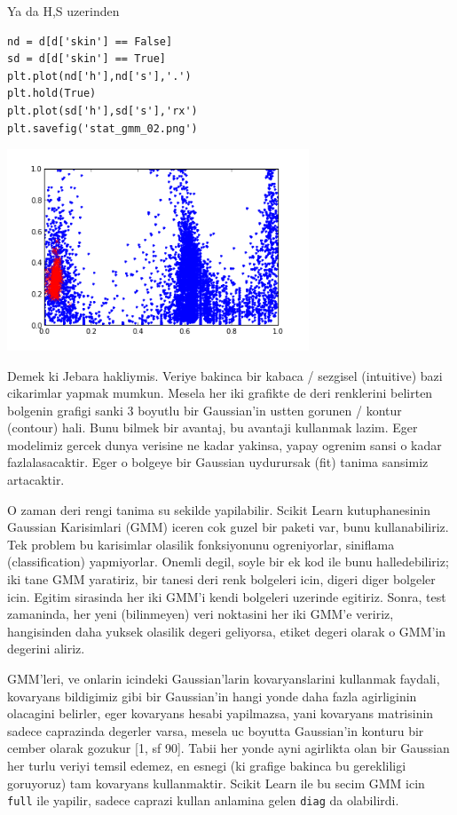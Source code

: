 \documentclass[12pt,fleqn]{article}\usepackage{../common}
\begin{document}
Ya da H,S uzerinden

\begin{verbatim}
nd = d[d['skin'] == False]
sd = d[d['skin'] == True]
plt.plot(nd['h'],nd['s'],'.')
plt.hold(True)
plt.plot(sd['h'],sd['s'],'rx')
plt.savefig('stat_gmm_02.png')
\end{verbatim}

\includegraphics[height=6cm]{stat_gmm_02.png}

Demek ki Jebara hakliymis. Veriye bakinca bir kabaca / sezgisel (intuitive)
bazi cikarimlar yapmak mumkun. Mesela her iki grafikte de deri renklerini
belirten bolgenin grafigi sanki 3 boyutlu bir Gaussian'in ustten gorunen /
kontur (contour) hali. Bunu bilmek bir avantaj, bu avantaji kullanmak
lazim. Eger modelimiz gercek dunya verisine ne kadar yakinsa, yapay ogrenim
sansi o kadar fazlalasacaktir. Eger o bolgeye bir Gaussian uydurursak (fit)
tanima sansimiz artacaktir. 

O zaman deri rengi tanima su sekilde yapilabilir. Scikit Learn
kutuphanesinin Gaussian Karisimlari (GMM) iceren cok guzel bir paketi var,
bunu kullanabiliriz. Tek problem bu karisimlar olasilik fonksiyonunu
ogreniyorlar, siniflama (classification) yapmiyorlar. Onemli degil, soyle
bir ek kod ile bunu halledebiliriz; iki tane GMM yaratiriz, bir tanesi deri
renk bolgeleri icin, digeri diger bolgeler icin. Egitim sirasinda her iki
GMM'i kendi bolgeleri uzerinde egitiriz. Sonra, test zamaninda, her yeni
(bilinmeyen) veri noktasini her iki GMM'e veririz, hangisinden daha yuksek
olasilik degeri geliyorsa, etiket degeri olarak o GMM'in degerini aliriz. 

GMM'leri, ve onlarin icindeki Gaussian'larin kovaryanslarini kullanmak
faydali, kovaryans bildigimiz gibi bir Gaussian'in hangi yonde daha fazla
agirliginin olacagini belirler, eger kovaryans hesabi yapilmazsa, yani
kovaryans matrisinin sadece caprazinda degerler varsa, mesela uc boyutta
Gaussian'in konturu bir cember olarak gozukur [1, sf 90]. Tabii her yonde
ayni agirlikta olan bir Gaussian her turlu veriyi temsil edemez, en esnegi
(ki grafige bakinca bu gerekliligi goruyoruz) tam kovaryans
kullanmaktir. Scikit Learn ile bu secim GMM icin \verb!full! ile yapilir,
sadece caprazi kullan anlamina gelen \verb!diag! da olabilirdi.
\end{document}
